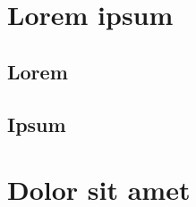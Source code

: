 \usepackage{lipsum}




\coverpage{\TITLE}{\SUBTITLE}{\AUTHOR}{\DATE}{\SUBJECT}
\newpage
\backgroundbarvisiblefalse
\pagestyle{plain}




\newpage
\tableofcontents

\part{Lorem ipsum}
\newpage
\chapter{Lorem} \label{ch:lorem}

\newpage
\chapter{Ipsum}\label{ch:ipsum}


\part{Dolor sit amet}
\newpage
